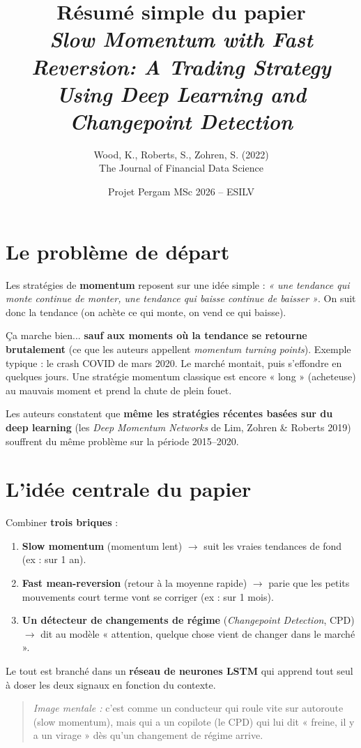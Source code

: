 \documentclass[11pt,a4paper]{article}
\title{Résumé simple du papier \\
\large \textit{Slow Momentum with Fast Reversion: A Trading Strategy Using Deep Learning and Changepoint Detection}}
\author{Wood, K., Roberts, S., Zohren, S. (2022) \\ \small The Journal of Financial Data Science}
\date{Projet Pergam MSc 2026 -- ESILV}
\begin{document}
\maketitle

\section{Le problème de départ}

Les stratégies de \textbf{momentum} reposent sur une idée simple : \emph{« une tendance qui monte continue de monter, une tendance qui baisse continue de baisser »}. On suit donc la tendance (on achète ce qui monte, on vend ce qui baisse).

Ça marche bien... \textbf{sauf aux moments où la tendance se retourne brutalement} (ce que les auteurs appellent \emph{momentum turning points}). Exemple typique : le crash COVID de mars 2020. Le marché montait, puis s'effondre en quelques jours. Une stratégie momentum classique est encore « long » (acheteuse) au mauvais moment et prend la chute de plein fouet.

Les auteurs constatent que \textbf{même les stratégies récentes basées sur du deep learning} (les \emph{Deep Momentum Networks} de Lim, Zohren \& Roberts 2019) souffrent du même problème sur la période 2015--2020.

\section{L'idée centrale du papier}

Combiner \textbf{trois briques} :
\begin{enumerate}[leftmargin=*]
    \item \textbf{Slow momentum} (momentum lent) $\rightarrow$ suit les vraies tendances de fond (ex : sur 1 an).
    \item \textbf{Fast mean-reversion} (retour à la moyenne rapide) $\rightarrow$ parie que les petits mouvements court terme vont se corriger (ex : sur 1 mois).
    \item \textbf{Un détecteur de changements de régime} (\emph{Changepoint Detection}, CPD) $\rightarrow$ dit au modèle « attention, quelque chose vient de changer dans le marché ».
\end{enumerate}

Le tout est branché dans un \textbf{réseau de neurones LSTM} qui apprend tout seul à doser les deux signaux en fonction du contexte.

\begin{quote}
\textit{Image mentale :} c'est comme un conducteur qui roule vite sur autoroute (slow momentum), mais qui a un copilote (le CPD) qui lui dit « freine, il y a un virage » dès qu'un changement de régime arrive.
\end{quote}
\end{document}
